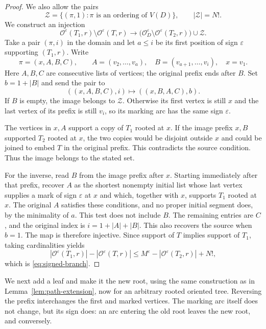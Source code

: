 \documentclass[11pt]{article}
\numberwithin{equation}{section}
\theoremstyle{definition}
\newcommand{\cO}{\mathcal O}
\newcommand{\cZ}{\mathcal Z}
\begin{document}
\begin{proof}
We also allow the pairs
\[
 \cZ=\{(\pi,1):\pi\text{ is an ordering of }V(D)\},
 \qquad |\cZ|=N!.
\]
We construct an injection
\[
 \cO^\varepsilon(T_1,r)\setminus\cO^\varepsilon(T,r)
 \longrightarrow
 \bigl(\cO_D^\varepsilon\setminus\cO^\varepsilon(T_2,r)\bigr)
 \cup\cZ.
\]
Take a pair $(\pi,i)$ in the domain and let $a\leq i$ be its first
position of sign $\varepsilon$ supporting $(T_1,r)$.  Write
\[
 \pi=(x,A,B,C),\qquad
 A=(v_2,\ldots,v_a),\quad B=(v_{a+1},\ldots,v_i),\quad x=v_1.
\]
Here $A,B,C$ are consecutive lists of vertices; the original prefix
ends after $B$.  Set $b=1+|B|$ and send the pair to
\begin{equation}
 ((x,A,B,C),i)\longmapsto ((x,B,A,C),b).
 \label{eq:signed-rotation}
\end{equation}
If $B$ is empty, the image belongs to $\cZ$.  Otherwise its first
vertex is still $x$ and the last vertex of its prefix is still $v_i$,
so its marking arc has the same sign $\varepsilon$.

The vertices in $x,A$ support a copy of $T_1$ rooted at $x$.
If the image prefix $x,B$ supported $T_2$ rooted at $x$, the two
copies would be disjoint outside $x$ and could be joined to embed
$T$ in the original prefix.  This contradicts the source condition.
Thus the image belongs to the stated set.

For the inverse, read $B$ from the image prefix after $x$.  Starting
immediately after that prefix, recover $A$ as the shortest nonempty
initial list whose last vertex supplies a mark of sign $\varepsilon$
at $x$ and which, together with $x$, supports $T_1$ rooted at $x$.
The original $A$ satisfies these conditions, and no proper initial
segment does, by the minimality of $a$.  This test does not include
$B$.  The remaining entries are $C$, and the original index is
$i=1+|A|+|B|$.  This also recovers the source when $b=1$.
The map is therefore injective.  Since support of $T$ implies support
of $T_1$, taking cardinalities yields
\[
 |\cO^\varepsilon(T_1,r)|-|\cO^\varepsilon(T,r)|
 \leq M^\varepsilon-|\cO^\varepsilon(T_2,r)|+N!,
\]
which is \eqref{eq:signed-branch}.
\end{proof}

We next add a leaf and make it the new root, using the same
construction as in Lemma~\ref{lem:path-extension}, now for an arbitrary
rooted oriented tree.  Reversing the prefix interchanges the first
and marked vertices.  The marking arc itself
does not change, but its sign does: an arc entering the old root
leaves the new root, and conversely.
\end{document}

